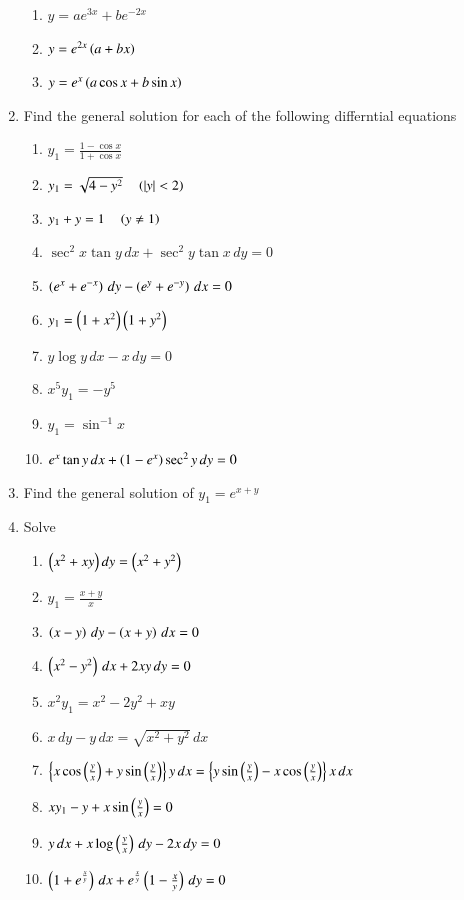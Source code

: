 \begin{enumerate}[label=\arabic*.,ref=\thesubsection.\theenumi]
\begin{enumerate}[label=(\roman*)]
%
\item  $y = ae^{3x}+be^{-2x}$
\item  $y = e^{2x}\left(a+bx\right)$
\item  $y = e^{x}\left(a\cos x +b \sin x\right)$
%
\end{enumerate}
%
\item Find the general solution for each of the following differntial equations
\begin{enumerate}[label=(\roman*)]
%
\item  $y_1 = \frac{1-\cos x}{1+\cos x}$
\item  $y_1 = \sqrt{4-y^2} \quad \left(\left\vert y\right\vert < 2\right)$
\item  $y_1 +y= 1 \quad \left(y \ne 1\right)$
\item  $\sec^2 x \tan y \, dx + \sec^2 y \tan x \, dy = 0$
\item  $\left(e^x +e^{-x}\right)\, dy - \left(e^y +e^{-y}\right)\, dx = 0$
\item  $y_1 = \left(1+x^2\right)\left(1+y^2\right)$
\item  $y\log y \, dx - x \, dy = 0$
\item  $x^5y_1 = -y^5$
\item  $y_1 = \sin ^{-1} x$
\item  $e^x \tan y \, dx + \left(1-e^x\right)\sec^2 y \, dy = 0$
%
\end{enumerate}
\item Find the general solution of $y_1 = e^{x+y}$
\item Solve
%
\begin{enumerate}[label = (\roman*)]
\item  $\left(x^2+xy\right)dy = \left(x^2+y^2\right)$
\item  $y_1 = \frac{x+y}{x}$
\item  $\left(x-y\right)\,dy - \left(x+y\right)\, dx = 0$
\item  $\left(x^2-y^2\right)\,dx +2x y\, dy = 0$
\item  $x^2y_1 = x^2-2y^2+xy$
\item  $x\,dy - y\, dx = \sqrt{x^2+y^2}\,dx$
\item  $\left\{x\cos\left(\frac{y}{x}\right)+y\sin\left(\frac{y}{x}\right)\right\}y\,dx = \left\{y\sin\left(\frac{y}{x}\right)-x\cos\left(\frac{y}{x}\right)\right\}x\,dx$
\item  $xy_1 -y +x \sin \left(\frac{y}{x}\right)= 0$
\item  $y\, dx +x \log \left(\frac{y}{x}\right)\,dy - 2x\,dy= 0$
\item  $\left(1+e^{\frac{x}{y}}\right)\, dx +e^{\frac{x}{y}}\left(1-\frac{x}{y}\right)\,dy = 0$

\end{enumerate}
\end{enumerate}
